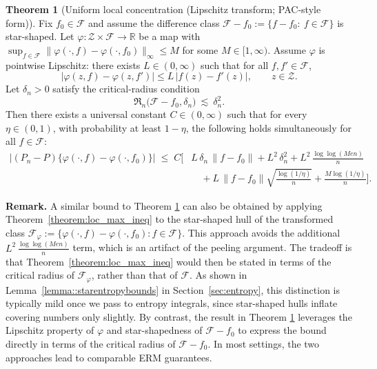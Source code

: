 \documentclass[11pt]{article}
\theoremstyle{plain}
\theoremstyle{definition} %
\newtheorem{theorem}{Theorem}
\begin{document}
 

\begin{theorem}[Uniform local concentration (Lipschitz transform; PAC-style form)]
\label{thm:uniform_local_conc_peeling}
Fix \(f_0\in\mathcal F\) and assume the difference class
\(\mathcal F-f_0:=\{f-f_0:\ f\in\mathcal F\}\) is star-shaped. Let
\(\varphi :\mathcal Z\times\mathcal F \rightarrow \mathbb{R}\) be a map with
\(\sup_{f\in\mathcal F}\|\varphi(\cdot,f)-\varphi(\cdot,f_0)\|_\infty \leq M\) for some $M \in [1, \infty)$.
Assume \(\varphi\) is pointwise Lipschitz: there exists \(L\in(0,\infty)\) such
that for all \(f,f'\in\mathcal F\),
\[
\bigl|\varphi(z,f)-\varphi(z,f')\bigr|
\le L\,|f(z)-f'(z)|,\qquad z\in\mathcal Z.
\]
Let \(\delta_n>0\) satisfy the critical-radius condition
\begin{equation}
\mathfrak R_n\bigl(\mathcal F-f_0,\delta_n\bigr)
\ \lesssim\
\delta_n^2.
\label{eq:crit_F}
\end{equation}
Then there exists a universal constant \(C\in(0,\infty)\) such that for every
\(\eta\in(0,1)\), with probability at least \(1-\eta\), the following holds
simultaneously for all \(f\in\mathcal F\):
\begin{align}
\bigl|(P_n-P)\{\varphi(\cdot,f)-\varphi(\cdot,f_0)\}\bigr|
\;\le\;
C\Biggl[
&L\,\delta_n\,\|f-f_0\|
+
L^2\,\delta_n^2
+
L^2\,\frac{\log\log(M e n)}{n}\\
& \quad +
L\,\|f-f_0\|\sqrt{\frac{\log(1/\eta)}{n}}
+
\frac{M\log(1/\eta)}{n}
\Biggr].
\label{eq:uniform_local_conc_peeling}
\end{align}
\end{theorem}



\textbf{Remark.} A similar bound to Theorem \ref{thm:uniform_local_conc_peeling} can also be obtained by applying Theorem~\ref{theorem:loc_max_ineq}
to the star-shaped hull of the transformed class
\(\mathcal F_{\varphi}:=\{\varphi(\cdot,f)-\varphi(\cdot,f_0): f\in\mathcal F\}\). This approach avoids the additional
\(L^2\,\frac{\log\log(M e n)}{n}\) term, which is an artifact of the peeling
argument. The tradeoff is that Theorem~\ref{theorem:loc_max_ineq} would then be
stated in terms of the critical radius of \(\mathcal F_{\varphi}\), rather than
that of \(\mathcal F\). As shown in Lemma~\ref{lemma::starentropybounds} in
Section~\ref{sec:entropy}, this distinction is typically mild once we pass to
entropy integrals, since star-shaped hulls inflate covering numbers only
slightly. By contrast, the result in Theorem \ref{thm:uniform_local_conc_peeling} leverages the Lipschitz property of
\(\varphi\) and star-shapedness of $\mathcal{F} - f_0$ to express the bound directly in terms of the critical radius of
\(\mathcal{F} - f_0\). In most settings, the two approaches lead to comparable ERM
guarantees.
\end{document}
